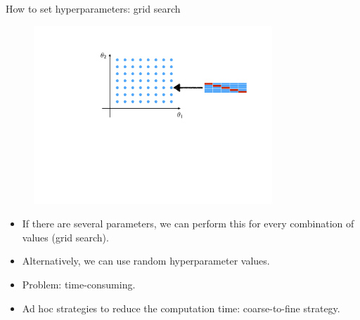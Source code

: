 \documentclass[xcolor=pdftex,dvipsnames,table]{beamer}
\begin{document}
\begin{frame}{How to set hyperparameters: grid search}
	\begin{figure}[htb]
		\includegraphics[width=0.8\textwidth]{../graphics/CV2.pdf}
	\end{figure}
	\begin{itemize}
		\item If there are several parameters, we can perform this for every combination of values (grid search).
		\item Alternatively, we can use random hyperparameter values.
		\item Problem: time-consuming.
		\item Ad hoc strategies to reduce the computation time: coarse-to-fine strategy.
	\end{itemize}
\end{frame}
\end{document}
